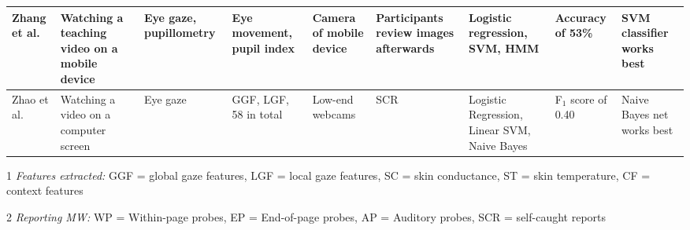 \begin{xtabular}{p{25mm}p{30mm}p{30mm}p{22mm}p{38mm}p{22mm}p{33mm}p{22mm}p{35mm}}
Zhang et al. \cite{ISI:000443429900018} & Watching a teaching video on a mobile device & Eye gaze, pupillometry & Eye movement, pupil index & Camera of mobile device & Participants review images afterwards & Logistic regression, SVM, HMM & Accuracy of 53\% & SVM classifier works best\\ \midrule
Zhao et al. \cite{Zhao2017ScalableApproach} & Watching a video on a computer screen & Eye gaze & GGF, LGF, 58 in total & Low-end webcams & SCR & Logistic Regression, Linear SVM, Naive Bayes & F$_1$ score of 0.40 & Naive Bayes net works best\\ \midrule
\bottomrule
\end{xtabular}
\begin{ThreePartTable}
        \begin{tablenotes}
        \small
        \item[1] \emph{Features extracted:} GGF = global gaze features, LGF = local gaze features, SC = skin conductance, ST = skin temperature, CF = context features
        \item[2] \emph{Reporting MW:} WP = Within-page probes, EP = End-of-page probes, AP = Auditory probes, SCR = self-caught reports
        \end{tablenotes}
\end{ThreePartTable}
\restoregeometry %
\twocolumn       %
